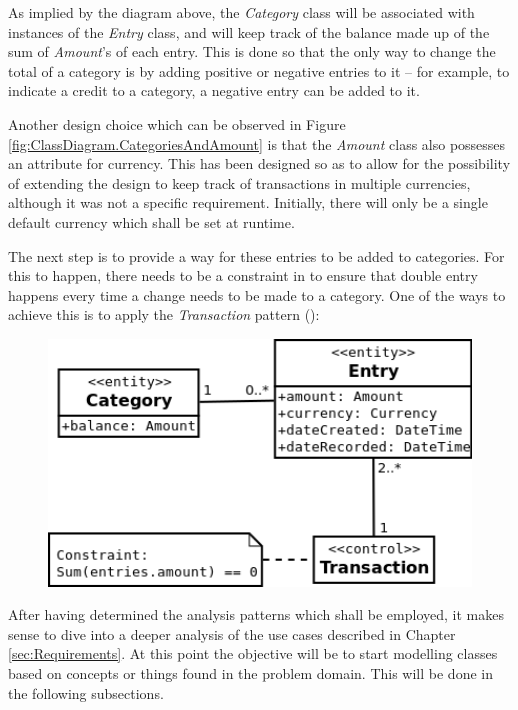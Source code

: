 As implied by the diagram above, the \emph{Category} class will be associated
with instances of the \emph{Entry} class, and will keep track of the balance
made up of the sum of \emph{Amount}'s of each entry. This is done so that the
only way to change the total of a category is by adding positive or negative
entries to it -- for example, to indicate a credit to a category, a negative
entry can be added to it.

Another design choice which can be observed in Figure
\ref{fig:ClassDiagram.CategoriesAndAmount} is that the \emph{Amount} class also
possesses an attribute for currency. This has been designed so as to allow for
the possibility of extending the design to keep track of transactions in
multiple currencies, although it was not a specific requirement. Initially,
there will only be a single default currency which shall be set at runtime.

The next step is to provide a way for these entries to be added to categories.
For this to happen, there needs to be a constraint in to ensure that double
entry happens every time a change needs to be made to a category. One of the
ways to achieve this is to apply the \emph{Transaction} pattern
(\cite[][Section~6.2]{fowler1997analysis}):
\begin{figure}[ht!]
  \begin{center}
    \includegraphics[width=14cm]{./contents/img/Class_Diagram_-_Transaction.png}
  \end{center}
\end{figure}
\FloatBarrier

After having determined the analysis patterns which shall be employed, it makes
sense to dive into a deeper analysis of the use cases described in Chapter
\ref{sec:Requirements}. At this point the objective will be to start modelling
classes based on concepts or things found in the problem domain. This will be
done in the following subsections.

